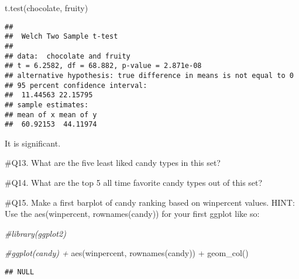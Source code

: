 \documentclass[
]{article}
\newenvironment{Shaded}{\begin{snugshade}}{\end{snugshade}}
\newcommand{\CommentTok}[1]{\textcolor[rgb]{0.56,0.35,0.01}{\textit{#1}}}
\newcommand{\FunctionTok}[1]{\textcolor[rgb]{0.00,0.00,0.00}{#1}}
\newcommand{\NormalTok}[1]{#1}
\newcommand{\SpecialCharTok}[1]{\textcolor[rgb]{0.00,0.00,0.00}{#1}}
\begin{document}
\begin{Shaded}
\begin{Highlighting}[]
\FunctionTok{t.test}\NormalTok{(chocolate, fruity)}
\end{Highlighting}
\end{Shaded}

\begin{verbatim}
## 
##  Welch Two Sample t-test
## 
## data:  chocolate and fruity
## t = 6.2582, df = 68.882, p-value = 2.871e-08
## alternative hypothesis: true difference in means is not equal to 0
## 95 percent confidence interval:
##  11.44563 22.15795
## sample estimates:
## mean of x mean of y 
##  60.92153  44.11974
\end{verbatim}

It is significant.

\#Q13. What are the five least liked candy types in this set?

\begin{Shaded}
\end{Shaded}

\#Q14. What are the top 5 all time favorite candy types out of this set?

\begin{Shaded}
\end{Shaded}

\#Q15. Make a first barplot of candy ranking based on winpercent values.
HINT: Use the aes(winpercent, rownames(candy)) for your first ggplot
like so:

\begin{Shaded}
\begin{Highlighting}[]
\CommentTok{\#library(ggplot2)}

\CommentTok{\#ggplot(candy) + }
  \FunctionTok{aes}\NormalTok{(winpercent, }\FunctionTok{rownames}\NormalTok{(candy)) }\SpecialCharTok{+}
  \FunctionTok{geom\_col}\NormalTok{()}
\end{Highlighting}
\end{Shaded}

\begin{verbatim}
## NULL
\end{verbatim}
\end{document}
